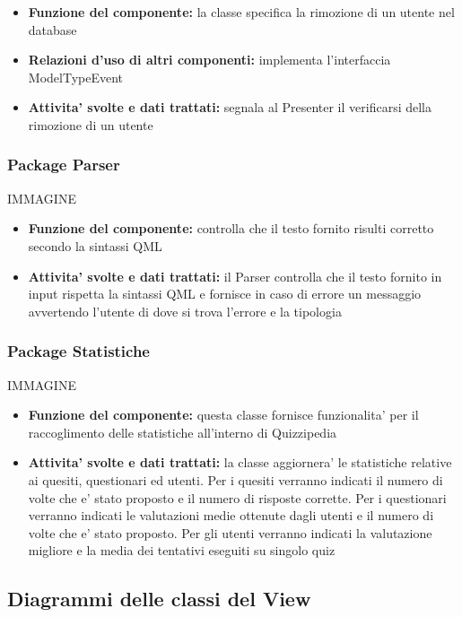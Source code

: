 \documentclass[a4paper,11pt]{article}
\begin{document}
			\begin{itemize}
		    	\item\textbf{Funzione del componente:} la classe specifica la rimozione di un utente nel database
				\item\textbf{Relazioni d'uso di altri componenti:} implementa l'interfaccia ModelTypeEvent
				\item\textbf{Attivita' svolte e dati trattati:} segnala al Presenter il verificarsi della rimozione di un utente
			\end{itemize}
			
			\subsubsection{Package Parser}
			IMMAGINE
 			\begin{itemize}
		    	\item\textbf{Funzione del componente:} controlla che il testo fornito risulti corretto secondo la sintassi QML
			\item\textbf{Attivita' svolte e dati trattati:} il Parser controlla che il testo fornito in input rispetta la sintassi QML e fornisce in caso di errore un messaggio avvertendo l'utente di dove si trova l'errore e la tipologia
			\end{itemize}
			
			\subsubsection{Package Statistiche}
			IMMAGINE
 			\begin{itemize}
		    	\item\textbf{Funzione del componente:} questa classe fornisce funzionalita' per il raccoglimento delle statistiche all'interno di Quizzipedia
			\item\textbf{Attivita' svolte e dati trattati:} la classe aggiornera' le statistiche relative ai quesiti, questionari ed utenti.
			Per i quesiti verranno indicati il numero di volte che e' stato proposto e il numero di risposte corrette.
			Per i questionari verranno indicati le valutazioni medie ottenute dagli utenti e il numero di volte che e' stato proposto.
			Per gli utenti verranno indicati la valutazione migliore e la media dei tentativi eseguiti su singolo quiz
			\end{itemize}
			
			\subsection{Diagrammi delle classi del View}
\end{document}

